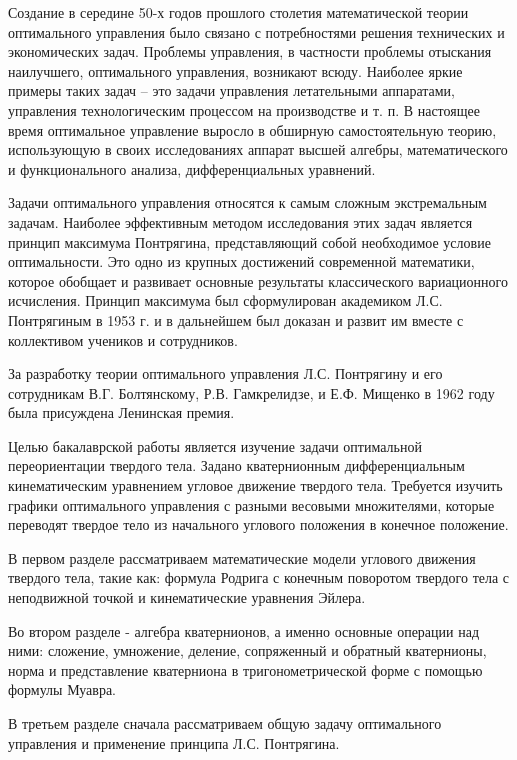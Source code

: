 \documentclass[14pt]{extreport}
\begin{document}


\tableofcontents

\intro

Создание в середине 50-х годов прошлого столетия математической теории оптимального управления было связано с потребностями решения технических и экономических задач. Проблемы управления, в частности проблемы отыскания наилучшего, оптимального управления, возникают всюду. Наиболее яркие примеры таких задач – это задачи управления летательными аппаратами, управления технологическим процессом на производстве и т. п. В настоящее время оптимальное управление выросло в обширную самостоятельную теорию, использующую в своих исследованиях аппарат высшей алгебры, математического и функционального анализа, дифференциальных уравнений.

Задачи оптимального управления относятся к самым сложным экстремальным задачам. Наиболее эффективным методом исследования этих задач является принцип максимума Понтрягина, представляющий собой необходимое условие оптимальности. Это одно из крупных достижений современной математики, которое обобщает и развивает основные результаты классического вариационного исчисления. Принцип максимума был сформулирован академиком Л.С. Понтрягиным в 1953 г. и в дальнейшем был доказан и развит им вместе с коллективом учеников и сотрудников.

За разработку теории оптимального управления Л.С. Понтрягину и его сотрудникам В.Г. Болтянскому, Р.В. Гамкрелидзе, и Е.Ф. Мищенко в 1962 году была присуждена Ленинская премия.

Целью бакалаврской работы является изучение задачи оптимальной переориентации твердого тела. Задано кватернионным дифференциальным кинематическим уравнением угловое движение твердого тела. Требуется изучить графики оптимального управления с разными весовыми множителями, которые переводят твердое тело из начального углового положения в конечное положение.

В первом разделе рассматриваем математические модели углового движения твердого тела, такие как: формула Родрига с конечным поворотом твердого тела с неподвижной точкой и кинематические уравнения Эйлера.

Во втором разделе - алгебра кватернионов, а именно основные операции над ними: сложение, умножение, деление, сопряженный и обратный кватернионы, норма и представление кватерниона в тригонометрической форме с помощью формулы Муавра.

В третьем разделе сначала рассматриваем общую задачу оптимального управления и применение принципа Л.С. Понтрягина.
\end{document}
